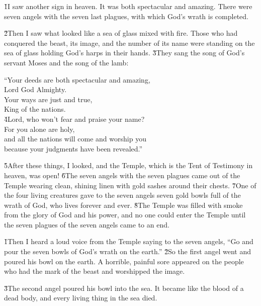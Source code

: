 \v{1}I saw another sign in heaven. It was both spectacular and amazing. There were seven angels with the seven last plagues, with which God's wrath is completed.

\v{2}Then I saw what looked like a sea of glass mixed with fire. Those who had conquered the beast, its image, and the number of its name were standing on the sea of glass holding God's harps in their hands. \v{3}They sang the song of God's servant Moses and the song of the lamb:

\begin{poetry}
\poeml ``Your deeds are both spectacular and amazing, \\
\poemll    Lord God Almighty. \\
\poeml Your ways are just and true, \\
\poemll    King of the nations. \\
\poeml \v{4}Lord, who won't fear and praise your name? \\
\poemll    For you alone are holy, \\
\poemlll       and all the nations will come and worship you \\
\poemll    because your judgments have been revealed.''
\end{poetry}

\v{5}After these things, I looked, and the Temple, which is the Tent of Testimony in heaven, was open! \v{6}The seven angels with the seven plagues came out of the Temple wearing clean, shining linen with gold sashes around their chests. \v{7}One of the four living creatures gave to the seven angels seven gold bowls full of the wrath of God, who lives forever and ever. \v{8}The Temple was filled with smoke from the glory of God and his power, and no one could enter the Temple until the seven plagues of the seven angels came to an end.

\v{1}Then I heard a loud voice from the Temple saying to the seven angels, ``Go and pour the seven bowls of God's wrath on the earth.'' \v{2}So the first angel went and poured his bowl on the earth. A horrible, painful sore appeared on the people who had the mark of the beast and worshipped the image.

\v{3}The second angel poured his bowl into the sea. It became like the blood of a dead body, and every living thing in the sea died.

